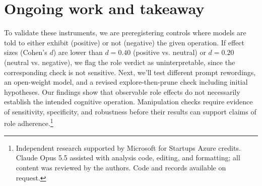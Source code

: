 \documentclass[11pt,a4paper]{article}
\begin{document}
\section{Ongoing work and takeaway}
To validate these instruments, we are preregistering controls where models are told to either exhibit (positive) or not (negative) the given operation. If effect sizes (Cohen's $d$) are lower than $d = 0.40$ (positive vs. neutral) or $d = 0.20$ (neutral vs. negative), we flag the role verdict as uninterpretable, since the corresponding check is not sensitive. Next, we'll test different prompt rewordings, an open-weight model, and a revised explore-then-prune check including initial hypotheses. Our findings show that observable role effects do not
necessarily establish the intended cognitive operation. Manipulation checks require evidence of sensitivity, specificity, and robustness before their results can support claims of role adherence.\footnote{Independent research supported by Microsoft for Startups Azure credits. Claude Opus 5.5 assisted with analysis code, editing, and formatting; all content was reviewed
by the authors. Code and records available on request.}



\end{document}
